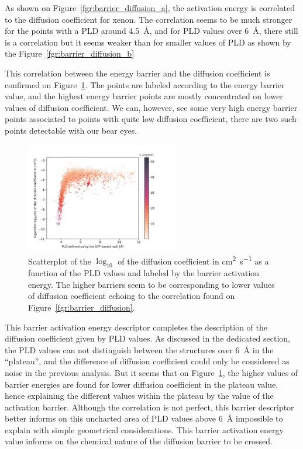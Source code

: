 \documentclass[main]{subfiles}
\begin{document}
As shown on Figure~\ref{fgr:barrier_diffusion_a}, the activation energy is correlated to the diffusion coefficient for xenon. The correlation seems to be much stronger for the points with a PLD around \SI{4.5}{\angstrom}, and for PLD values over \SI{6}{\angstrom}, there still is a correlation but it seems weaker than for smaller values of PLD as shown by the Figure~\ref{fgr:barrier_diffusion_b}

This correlation between the energy barrier and the diffusion coefficient is confirmed on Figure~\ref{fgr:diff_pld_barrier}. The points are labeled according to the energy barrier value, and the highest energy barrier points are mostly concentrated on lower values of diffusion coefficient. We can, however, see some very high energy barrier points associated to points with quite low diffusion coefficient, there are two such points detectable with our bear eyes. 

\begin{figure}[ht]
  \centering
    \includegraphics[width=0.6\textwidth]{figures/5-diffusion/difflog_Df-uff298K_barrier.pdf}
    \caption{ Scatterplot of the $\log_{10}$ of the diffusion coefficient in \si{\square\cm\per\s} as a function of the PLD values and labeled by the barrier activation energy. The higher barriers seem to be corresponding to lower values of diffusion coefficient echoing to the correlation found on Figure~\ref{fgr:barrier_diffusion}.}\label{fgr:diff_pld_barrier}
\end{figure}

This barrier activation energy descriptor completes the description of the diffusion coefficient given by PLD values. As discussed in the dedicated section, the PLD values can not distinguish between the structures over \SI{6}{\angstrom} in the ``plateau'', and the difference of diffusion coefficient could only be considered as noise in the previous analysis. But it seems that on Figure~\ref{fgr:diff_pld_barrier}, the higher values of barrier energies are found for lower diffusion coefficient in the plateau value, hence explaining the different values within the plateau by the value of the activation barrier. 
Although the correlation is not perfect, this barrier descriptor better informs on this uncharted area of PLD values above \SI{6}{\angstrom} impossible to explain with simple geometrical considerations. This barrier activation energy value informs on the chemical nature of the diffusion barrier to be crossed. 
\end{document}
